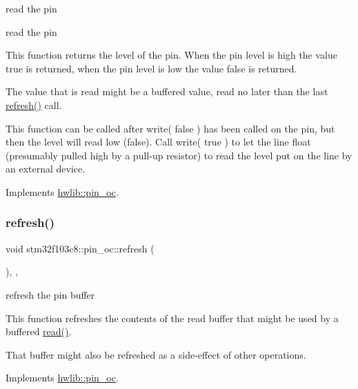 read the pin

read the pin

This function returns the level of the pin. When the pin level is high the value true is returned, when the pin level is low the value false is returned.

The value that is read might be a buffered value, read no later than the last \hyperlink{classstm32f103c8_1_1pin__oc_a6f063df5c0c2a290ed095b26faab4aab}{refresh()} call.

This function can be called after write( false ) has been called on the pin, but then the level will read low (false). Call write( true ) to let the line float (presumably pulled high by a pull-\/up resistor) to read the level put on the line by an external device. 

Implements \hyperlink{classhwlib_1_1pin__oc_a51180afd605add59b96105fa98e29f88}{hwlib\+::pin\+\_\+oc}.

\mbox{\label{classstm32f103c8_1_1pin__oc_a6f063df5c0c2a290ed095b26faab4aab}} 
\subsubsection{\texorpdfstring{refresh()}{refresh()}}
{\footnotesize\ttfamily void stm32f103c8\+::pin\+\_\+oc\+::refresh (\begin{DoxyParamCaption}{ }\end{DoxyParamCaption})\hspace{0.3cm}{\ttfamily [inline]}, {\ttfamily [override]}, {\ttfamily [virtual]}}





refresh the pin buffer

This function refreshes the contents of the read buffer that might be used by a buffered \hyperlink{classstm32f103c8_1_1pin__oc_ae733a459b1f10ca38ac20f2d60923833}{read()}.

That buffer might also be refreshed as a side-\/effect of other operations. 

Implements \hyperlink{classhwlib_1_1pin__oc_a573740f6f790c5792efc9cdd44cc73b3}{hwlib\+::pin\+\_\+oc}.

\mbox{\label{classstm32f103c8_1_1pin__oc_a9e5f3ecc1c5aff4b4277ea33d26ef0c7}} 
